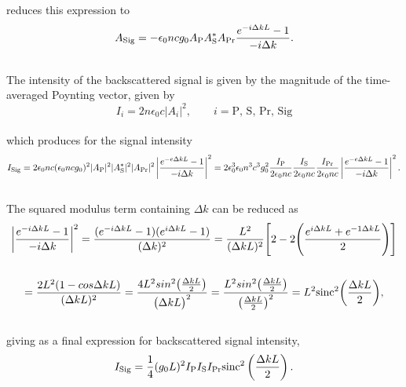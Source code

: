 reduces this expression to
\\
\begin{equation}
  A_{\rm Sig} = -\epsilon_{0}ncg_{0}A_{\rm P}A_{\rm S}^{*}A_{\rm Pr} \frac{e^{-i\Delta kL} - 1}{-i\Delta k}.
\end{equation}
\\
The intensity of the backscattered signal is given by the magnitude of the time-averaged Poynting vector, given by
\\
\begin{equation}
  I_{i} = 2n\epsilon_{0}c|A_{i}|^{2}, \qquad i = \mathrm{P},\,\mathrm{S},\,\mathrm{Pr},\,\mathrm{Sig}
\end{equation}
\\
which produces for the signal intensity
\\
\begin{equation}
  I_{\rm Sig} = 2\epsilon_{0}nc(\epsilon_{0}ncg_{0})^{2}|A_{\rm P}|^{2}|A_{\rm S}^{*}|^{2}|A_{\rm Pr}|^{2}\left|\frac{e^{-e\Delta kL} - 1}{-i\Delta k}\right|^{2}
  = 2\epsilon_{0}^{3}\epsilon_{0}n^{3}c^{3}g_{0}^{2}\frac{I_{\rm P}}{2\epsilon_{0}nc}\frac{I_{\rm S}}{2\epsilon_{0}nc}\frac{I_{\rm Pr}}{2\epsilon_{0}nc}\left|\frac{e^{-e\Delta kL} - 1}{-i\Delta k}\right|^{2}.
\end{equation}
\\
The squared modulus term containing \(\Delta k\) can be reduced as
\\
\begin{gather}
  \bigg|\frac{e^{-i\Delta kL} - 1}{-i\Delta k}\bigg|^{2} = \frac{(e^{-i\Delta kL} - 1)(e^{i\Delta kL} - 1)}{(\Delta k)^{2}} = \frac{L^{2}}{(\Delta kL)^{2}}\Bigg[ 2 - 2\Bigg(\frac{e^{i\Delta kL} + e^{-1\Delta kL}}{2}\Bigg)\Bigg] \notag \\ \notag \\
  = \frac{2L^{2}(1 - cos\Delta kL)}{(\Delta kL)^{2}} = \frac{4L^{2}sin^{2}\big(\frac{\Delta kL}{2}\big)}{\big(\Delta kL\big)^{2}} = \frac{L^{2}sin^{2}\big(\frac{\Delta kL}{2}\big)}{\big(\frac{\Delta kL}{2}\big)^{2}} = L^{2}\mathrm{sinc}^{2}\bigg(\frac{\Delta kL}{2}\bigg),
\end{gather}
\\
giving as a final expression for backscattered signal intensity,
\\
\begin{equation}
I_{\rm Sig} = \frac{1}{4}(g_{0}L)^{2}I_{\rm P}I_{\rm S}I_{\rm Pr}\mathrm{sinc}^{2}\left(\frac{\Delta kL}{2}\right).
\end{equation}
\\

